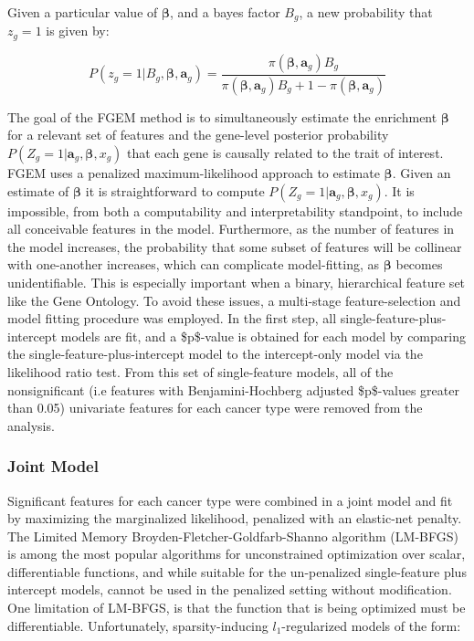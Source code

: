Given a particular value of \(\boldsymbol{\beta}\), and a bayes factor \(B_g\),  a new probability that \(z_g=1\) is given by:

$$P(z_g=1 | B_g, \boldsymbol{\beta},\textbf{a}_g) = \frac{\pi(\boldsymbol{\beta},\textbf{a}_g) B_g}{\pi(\boldsymbol{\beta} , \textbf{a}_g) B_g + 1 - \pi(\boldsymbol{\beta},\textbf{a}_g)}$$


The goal of the FGEM method is to simultaneously estimate the enrichment $\boldsymbol{\beta}$ for a relevant set of features and the gene-level posterior probability \(P(Z_g=1|\textbf{a}_g,\boldsymbol{\beta},x_g)\) that each gene is causally related to the trait of interest.  FGEM uses a penalized maximum-likelihood approach to estimate $\boldsymbol{\beta}$.  Given an estimate of $\boldsymbol{\beta}$ it is straightforward to compute \(P(Z_g=1|\textbf{a}_g,\boldsymbol{\beta},x_g)\).
It is impossible, from both a computability and interpretability standpoint, to include all conceivable features in the model.
Furthermore, as the number of features in the model increases, the probability that some subset of features will be collinear with one-another increases,
which can complicate model-fitting, as \(\boldsymbol{\beta}\) becomes unidentifiable. This is especially important when a binary, hierarchical feature set
like the Gene Ontology.  To avoid these issues, a multi-stage feature-selection and model fitting procedure was employed. In the first step, all
single-feature-plus-intercept models are fit, and a \$p\$-value is obtained for each model by comparing the single-feature-plus-intercept model to the intercept-only model via the
likelihood ratio test.  From this set of single-feature models, all of the nonsignificant (i.e features with Benjamini-Hochberg adjusted
\$p\$-values greater than 0.05) univariate features for each cancer type were removed from the analysis.

\subsubsection{Joint Model}\label{sec:orga62a234}

Significant features for each cancer type were combined in a joint model and fit by maximizing the marginalized likelihood, penalized with an elastic-net penalty.  The Limited Memory Broyden-Fletcher-Goldfarb-Shanno algorithm (LM-BFGS) \cite{LMBFGS} is among the most popular algorithms
for unconstrained optimization over scalar, differentiable functions, and while suitable for the un-penalized single-feature plus intercept models, cannot be used in the penalized setting without modification.  One limitation of LM-BFGS, is that the function that is being optimized must be differentiable.  Unfortunately, sparsity-inducing $l_{\text{1}}$-regularized models of the form:

